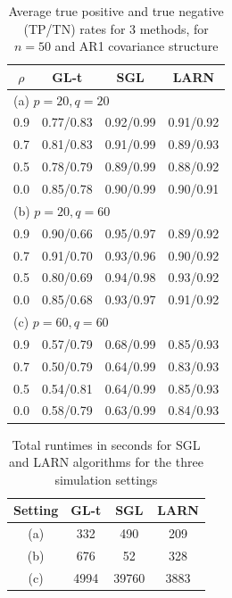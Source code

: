 %
\begin{table}[t]
\centering
\begin{small}
    \caption{Average true positive and true negative (TP/TN) rates for 3 methods, for $n=50$ and AR1 covariance structure}
    \vspace{.1in}
    \begin{tabular}{c|ccc}
    \hline
    $\rho$ & GL-t & SGL       & LARN      \\ \hline
    \multicolumn{4}{l}{ (a) $p=20, q=20$}\\\hline
    0.9               & 0.77/0.83          & 0.92/0.99 & 0.91/0.92 \\
    0.7               & 0.81/0.83          & 0.91/0.99 & 0.89/0.93 \\
    0.5               & 0.78/0.79          & 0.89/0.99 & 0.88/0.92 \\
    0.0               & 0.85/0.78          & 0.90/0.99 & 0.90/0.91 \\ \hline
    \multicolumn{4}{l}{ (b) $p=20, q=60$}\\\hline
    0.9               & 0.90/0.66          & 0.95/0.97 & 0.89/0.92 \\
    0.7               & 0.91/0.70          & 0.93/0.96 & 0.90/0.92 \\
    0.5               & 0.80/0.69          & 0.94/0.98 & 0.93/0.92 \\
    0.0               & 0.85/0.68          & 0.93/0.97 & 0.91/0.92 \\ \hline
    \multicolumn{4}{l}{ (c) $p=60, q=60$}\\\hline
    0.9               & 0.57/0.79          & 0.68/0.99 & 0.85/0.93 \\
    0.7               & 0.50/0.79          & 0.64/0.99 & 0.83/0.93 \\
    0.5               & 0.54/0.81          & 0.64/0.99 & 0.85/0.93 \\
    0.0               & 0.58/0.79          & 0.63/0.99 & 0.84/0.93 \\ \hline
    \end{tabular}
        \end{small}
    \label{table:simtable2}
\end{table}

\begin{table}[t]
\centering
    \caption{Total runtimes in seconds for SGL and LARN algorithms for the three simulation settings}
    \vspace{.1in}
    \begin{tabular}{c|ccc}
    \hline
    Setting & GL-t & SGL    & LARN \\ \hline
    (a)     & 332 & 490    & 209  \\
    (b)       & 676 & 52  & 328 \\
    (c)       & 4994 & 39760 & 3883 \\ \hline
    \end{tabular}
    \label{table:simtimetable}
\end{table}


